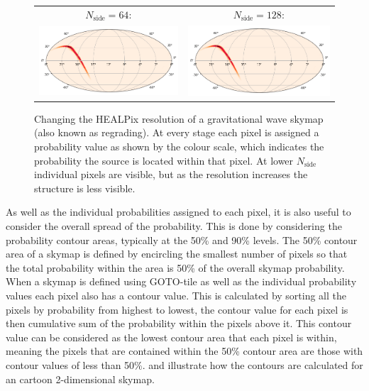 \begin{colsection}
\begin{colsection}
\begin{figure}[p]
\begin{center}
\begin{tabular}{cc}
$N_\text{side} = 64$: &
$N_\text{side} = 128$:
\\

\includegraphics[width=0.45\linewidth]{images/regrade/64.png} &
\includegraphics[width=0.45\linewidth]{images/regrade/128.png}
\\

\end{tabular}

\end{center}

\caption[Regrading a gravitational wave skymap]{Changing the HEALPix resolution of a gravitational wave skymap (also known as regrading). At every stage each pixel is assigned a probability value as shown by the colour scale, which indicates the probability the source is located within that pixel. At lower $N_\text{side}$ individual pixels are visible, but as the resolution increases the structure is less visible.
}
\label{fig:skymap_regrade}
\end{figure}


\clearpage

As well as the individual probabilities assigned to each pixel, it is also useful to consider the overall spread of the probability. This is done by considering the probability contour areas, typically at the 50\% and 90\% levels. The 50\% contour area of a skymap is defined by encircling the smallest number of pixels so that the total probability within the area is 50\% of the overall skymap probability. When a skymap is defined using GOTO-tile as well as the individual probability values each pixel also has a contour value. This is calculated by sorting all the pixels by probability from highest to lowest, the contour value for each pixel is then cumulative sum of the probability within the pixels above it. This contour value can be considered as the lowest contour area that each pixel is within, meaning the pixels that are contained within the 50\% contour area are those with contour values of less than 50\%.  and  illustrate how the contours are calculated for an cartoon 2-dimensional skymap.


\end{colsection}
\end{colsection}
